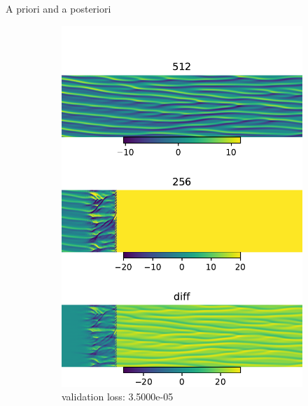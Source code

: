 \documentclass[paper slide]{beamer}
\begin{document}
\begin{frame}{A priori and a posteriori}
	\begin{figure}[ht]
		\centering
		\begin{subfigure}[b]{0.33\textwidth}
			\centering 
			\includegraphics[width=\textwidth]
			{fig/ks_nu0.1_N1512N2256_correct_cmp_lr1e-4.pdf} 
			\caption{validation loss: 3.5000e-05} 
		\end{subfigure}
		\begin{subfigure}[b]{0.33\textwidth}
			\centering 

\end{subfigure}
\end{figure}
\end{frame}
\end{document}
